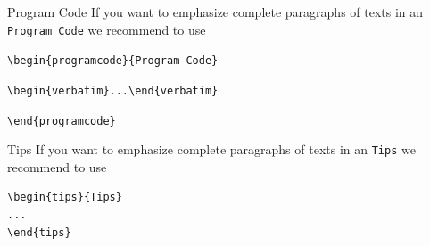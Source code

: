 \begin{programcode}{Program Code}
If you want to emphasize complete paragraphs of texts in an \verb|Program Code| we recommend to
use

\verb|\begin{programcode}{Program Code}|

\verb|\begin{verbatim}...\end{verbatim}|

\verb|\end{programcode}|

\end{programcode}
%
\begin{tips}{Tips}
If you want to emphasize complete paragraphs of texts in an \verb|Tips| we recommend to
use  \begin{verbatim}\begin{tips}{Tips}
...
\end{tips}\end{verbatim}
\end{tips}
%

